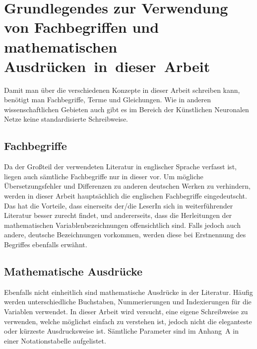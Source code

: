 \documentclass[
	a4paper,
	12pt,
	ngerman,
	oneside
]{scrreprt}											%
\begin{document}
		\section{Grundlegendes zur Verwendung von Fachbegriffen und mathematischen \mbox{Ausdrücken in dieser Arbeit}}\label{Fachbegriffe&Mathe}
			Damit man über die verschiedenen Konzepte in dieser Arbeit schreiben kann, benötigt man Fachbegriffe, Terme und Gleichungen. Wie in anderen wissenschaftlichen Gebieten auch gibt es im Bereich der Künstlichen Neuronalen Netze keine standardisierte Schreibweise. 
		
		\subsection{Fachbegriffe}\label{Fachbegriffe}
			Da der Großteil der verwendeten Literatur in englischer Sprache verfasst ist, liegen auch sämtliche Fachbegriffe nur in dieser vor. Um mögliche Übersetzungsfehler und Differenzen zu anderen deutschen Werken zu verhindern, werden in dieser Arbeit hauptsächlich die englischen Fachbegriffe eingedeutscht. Das hat die Vorteile, dass einerseits der/die LeserIn sich in weiterführender Literatur besser zurecht findet, und andererseits, dass die Herleitungen der mathematischen Variablenbezeichnungen offensichtlich sind. Falls jedoch auch andere, deutsche Bezeichnungen vorkommen, werden diese bei Erstnennung des Begriffes ebenfalls erwähnt.
		
		\subsection{Mathematische Ausdrücke}\label{Mathe}
			Ebenfalls nicht einheitlich sind mathematische Ausdrücke in der Literatur. Häufig werden unterschiedliche Buchstaben, Nummerierungen und Indexierungen für die Variablen verwendet. In dieser Arbeit wird versucht, eine eigene Schreibweise zu verwenden, welche möglichst einfach zu verstehen ist, jedoch nicht die eleganteste oder kürzeste Ausdrucksweise ist. Sämtliche Parameter sind im \mbox{Anhang A} in einer Notationstabelle aufgelistet. 
		
\end{document}
